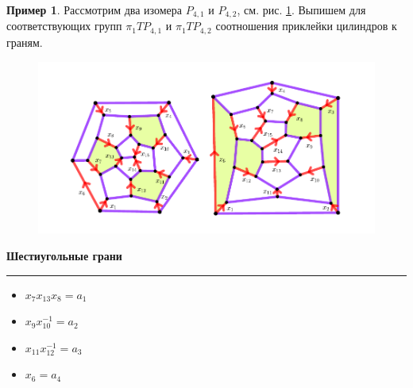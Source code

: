 \documentclass[14pt, dvipsnames, twoside]{extarticle}
\theoremstyle{definition}
\newtheorem{example}{Пример}
\theoremstyle{remark}
\begin{document}
\begin{example}

Рассмотрим два изомера $P_{4, 1}$ и $P_{4, 2}$, см. рис. \ref{pict_P_4}. Выпишем для соответствующих групп $\pi_1TP_{4, 1}$ и $\pi_1TP_{4, 2}$ соотношения приклейки цилиндров к граням.


\begin{figure}
\begin{center}
\includegraphics[scale=1.2]{P_4}
\caption{}\label{pict_P_4}
\end{center} 
\end{figure}



\newpage


\begin{center}

\bf Шестиугольные грани

\end{center}

\hrule





\begin{multicols}{2}




\begin{itemize}



\item $x_7x_{13}x_8 = a_1$

\item $x_9x_{10}^{-1} = a_2$

\item $x_{11}x_{12}^{-1} = a_3$

\item $x_6 = a_4$

\end{itemize}

\columnbreak


\end{multicols}
\end{example}
\end{document}
